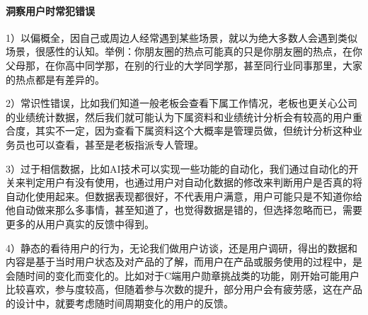 \documentclass[letterpaper,10pt,english]{sphinxmanual}
\begin{document}
\paragraph{洞察用户时常犯错误}
\label{\detokenize{chapter_knowledge/users_analysis:id27}}
1）以偏概全，因自己或周边人经常遇到某些场景，就以为绝大多数人会遇到类似场景，很感性的认知。举例：你朋友圈的热点可能真的只是你朋友圈的热点，在你父母那，在你高中同学那，在别的行业的大学同学那，甚至同行业同事那里，大家的热点都是有差异的。

2）常识性错误，比如我们知道一般老板会查看下属工作情况，老板也更关心公司的业绩统计数据，然后我们就可能认为下属资料和业绩统计分析会有较高的用户重合度，其实不一定，因为查看下属资料这个大概率是管理员做，但统计分析这种业务员也可以查看，甚至是老板指派专人管理。

3）过于相信数据，比如AI技术可以实现一些功能的自动化，我们通过自动化的开关来判定用户有没有使用，也通过用户对自动化数据的修改来判断用户是否真的将自动化使用起来。但数据表现都很好，不代表用户满意，用户可能只是不知道你给他自动做来那么多事情，甚至知道了，也觉得数据是错的，但选择忽略而已，需要更多的从用户真实的反馈中得到。

4）静态的看待用户的行为，无论我们做用户访谈，还是用户调研，得出的数据和内容是基于当时用户状态及对产品的了解，而用户在产品或服务使用的过程中，是会随时间的变化而变化的。比如对于C端用户勋章挑战类的功能，刚开始可能用户比较喜欢，参与度较高，但随着参与次数的提升，部分用户会有疲劳感，这在产品的设计中，就要考虑随时间周期变化的用户的反馈。
\end{document}
